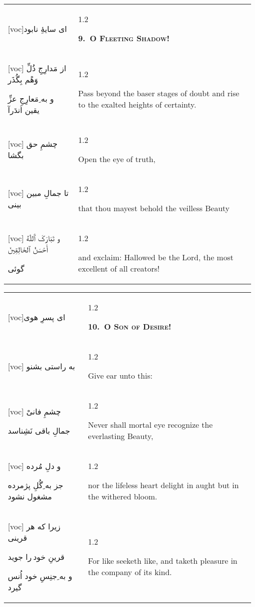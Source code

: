 \documentclass[11pt]{article}
\makeatletter
\newenvironment{orig}
  {\begin{farsi}[voc]}
  {\end{farsi}}
\newenvironment{trans}
  {\Large\begin{spacing}{1.2}\raggedright}
  {\end{spacing}}
\newenvironment{word}
  {\begin{tabular}[t]{p{2.75in}@{\hspace{3em}}p{2.875in}}}
  {\end{tabular}}
\newcommand{\ayat}[2]{\begin{orig}#1\end{orig} & \begin{trans}#2\end{trans}}
\newcommand{\heading}[2]{\textsc{\textbf{#1}} %
}
\makeatother
\begin{document}
\newpage

\begin{word}
\ayat{ای سايۀِ نابود}{\heading{9.~O Fleeting Shadow!}{}} \\ \ayat{
از مَدارِجِ ذُلِّ وَهْم بِگُذَر

و به ِمَعارِجِ عزِّ يقين اَندَرآ
}{Pass beyond the baser stages of doubt and rise to the exalted heights of
  certainty.} \vspace{-1ex}\\ \ayat{
چشمِ حق بگشا
}{Open the eye of truth,} \vspace{-1ex}\\ \ayat{
تا جمالِ مبين بينی
}{that thou mayest behold the veilless Beauty} \vspace{-1ex}\\ \ayat{
و تَبَارَکَ ٱَللّٰهُ أَحْسَنُ ٱلخَالِقِينْ

گوئی
}{and exclaim: Hallowed be the Lord, the most excellent of all creators!}
\end{word}

\newpage

\begin{word}
\ayat{ای پسرِ هوی}{\heading{10.~O Son of Desire!}{}} \\ \ayat{
به راستی بشنو
}{Give ear unto this:} \vspace{-1ex}\\ \ayat{
چشمِ فانیْ

جمالِ باقی نَشِناسد
}{Never shall mortal eye recognize the everlasting Beauty,} \vspace{-1ex}\\ \ayat{
و دلِ مُرده

جز به ِگُلِ پژمرده مشغول نشود
}{nor the lifeless heart delight in aught but in the withered bloom.} \\ \ayat{
زيرا كه هر قرينی

قرينِ خود را جويد

و به ِجنِسِ خود اُنس گيرد
}{For like seeketh like, and taketh pleasure in the company of its kind.}
\end{word}

\newpage
\end{document}

